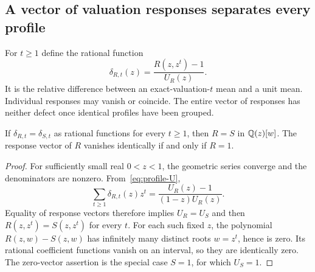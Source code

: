 \subsection{A vector of valuation responses separates every profile}

For $t\geq1$ define the rational function
\begin{equation}\label{eq:profile-response}
 \delta_{R,t}(z)=\frac{R(z,z^t)-1}{U_R(z)}.
\end{equation}
It is the relative difference between an exact-valuation-$t$ mean
and a unit mean.  Individual responses may vanish or coincide.
The entire vector of responses has neither defect once identical
profiles have been grouped.

\begin{lemma}
\label{lem:profile-injective}
If $\delta_{R,t}=\delta_{S,t}$ as rational functions for every
$t\geq1$, then $R=S$ in $\mathbb Q(z)[w]$.  The response vector of $R$
vanishes identically if and only if $R=1$.
\end{lemma}
\begin{proof}
For sufficiently small real $0<z<1$, the geometric series converge
and the denominators are nonzero.  From~\eqref{eq:profile-U},
\[
 \sum_{t\geq1}\delta_{R,t}(z)z^t
       =\frac{U_R(z)-1}{(1-z)U_R(z)}.
\]
Equality of response vectors therefore implies $U_R=U_S$ and
then $R(z,z^t)=S(z,z^t)$ for every $t$.  For each such fixed $z$,
the polynomial $R(z,w)-S(z,w)$ has infinitely many distinct roots
$w=z^t$, hence is zero.  Its rational coefficient functions vanish
on an interval, so they are identically zero.  The zero-vector
assertion is the special case $S=1$, for which $U_S=1$.
\end{proof}

